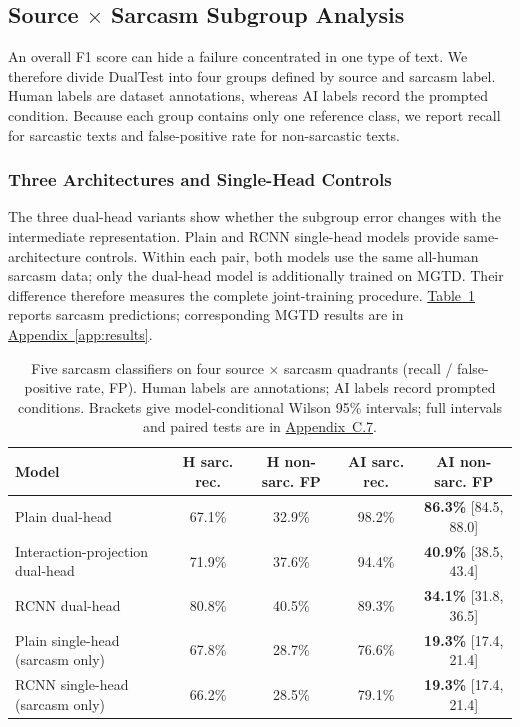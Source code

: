 \documentclass[11pt]{article}
\newcommand{\Appref}[1]{\hyperref[#1]{Appendix~\ref*{#1}}}
\newcommand{\Tabref}[1]{\hyperref[#1]{Table~\ref*{#1}}}
\begin{document}
\subsection{Source $\times$ Sarcasm Subgroup Analysis}
\label{sec:quadrant}

An overall F1 score can hide a failure concentrated in one type of text. We therefore divide DualTest into four groups defined by source and sarcasm label. Human labels are dataset annotations, whereas AI labels record the prompted condition. Because each group contains only one reference class, we report recall for sarcastic texts and false-positive rate for non-sarcastic texts.

\subsubsection{Three Architectures and Single-Head Controls}
\label{sec:quadrant-results}

The three dual-head variants show whether the subgroup error changes with the intermediate representation. Plain and RCNN single-head models provide same-architecture controls. Within each pair, both models use the same all-human sarcasm data; only the dual-head model is additionally trained on MGTD. Their difference therefore measures the complete joint-training procedure. \Tabref{tab:quadrant} reports sarcasm predictions; corresponding MGTD results are in \Appref{app:results}.

\begin{table}[t]
  \centering
  \footnotesize
  \setlength{\tabcolsep}{3pt}
  \begin{tabular}{@{}lcccc@{}}
    \toprule
    \textbf{Model} & \textbf{H sarc. rec.} & \textbf{H non-sarc. FP} & \textbf{AI sarc. rec.} & \textbf{AI non-sarc. FP} \\
    \midrule
    Plain dual-head & 67.1\% & 32.9\% & 98.2\% & \textbf{86.3\%} [84.5, 88.0] \\
    Interaction-projection dual-head & 71.9\% & 37.6\% & 94.4\% & \textbf{40.9\%} [38.5, 43.4] \\
    RCNN dual-head & 80.8\% & 40.5\% & 89.3\% & \textbf{34.1\%} [31.8, 36.5] \\
    Plain single-head (sarcasm only) & 67.8\% & 28.7\% & 76.6\% & \textbf{19.3\%} [17.4, 21.4] \\
    RCNN single-head (sarcasm only) & 66.2\% & 28.5\% & 79.1\% & \textbf{19.3\%} [17.4, 21.4] \\
    \bottomrule
  \end{tabular}
  \caption{Five sarcasm classifiers on four source $\times$ sarcasm quadrants (recall / false-positive rate, FP). Human labels are annotations; AI labels record prompted conditions. Brackets give model-conditional Wilson 95\% intervals; full intervals and paired tests are in \hyperref[app:c7]{Appendix~C.7}.}
  \label{tab:quadrant}
\end{table}
\end{document}
